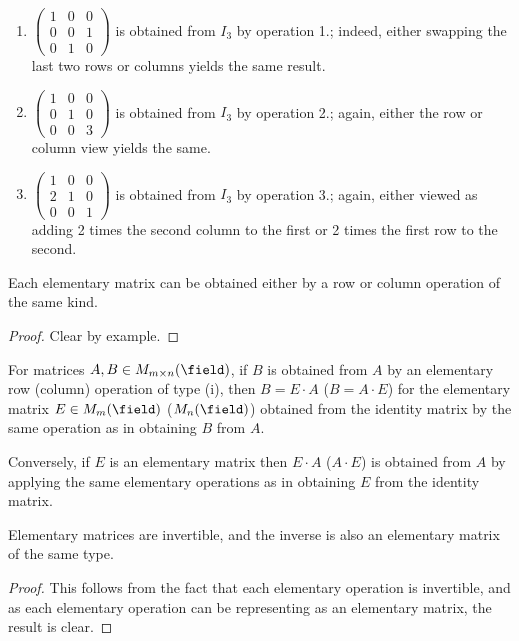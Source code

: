\begin{example}
    \begin{enumerate}
        \item $\begin{pmatrix}
            1 & 0 & 0\\
            0 & 0 & 1\\
            0 & 1 & 0
        \end{pmatrix}$ is obtained from $I_3$ by operation 1.; indeed, either swapping the last two rows or columns yields the same result.
        \item $\begin{pmatrix}
            1 & 0 & 0\\
            0 & 1 & 0\\
            0 & 0 & 3
        \end{pmatrix}$ is obtained from $I_3$ by operation 2.; again, either the row or column view yields the same.
        \item $\begin{pmatrix}
            1 & 0 & 0\\
            2 & 1 & 0\\
            0 & 0 & 1
        \end{pmatrix}$ is obtained from $I_3$ by operation 3.; again, either viewed as adding 2 times the second column to the first or 2 times the first row to the second.
    \end{enumerate}
\end{example}

\begin{theorem}
    Each elementary matrix can be obtained either by a row or column operation of the same kind.
\end{theorem}
\begin{proof}
    Clear by example.
\end{proof}

\begin{theorem}
For matrices $A, B \in M_{m \times n}(\field)$, if $B$ is obtained from $A$ by an elementary row (column) operation of type (i), then $B = E \cdot A$ ($B = A \cdot E$) for the elementary matrix $E \in M_{m}(\field)$ ($M_n(\field)$) obtained from the identity matrix by the same operation as in obtaining $B$ from $A$.

Conversely, if $E$ is an elementary matrix then $E \cdot A$ ($A \cdot E$) is obtained from $A$ by applying the same elementary operations as in obtaining $E$ from the identity matrix.
\end{theorem}


\begin{proposition}
    Elementary matrices are invertible, and the inverse is also an elementary matrix of the same type.
\end{proposition}
\begin{proof}
    This follows from the fact that each elementary operation is invertible, and as each elementary operation can be representing as an elementary matrix, the result is clear.
\end{proof}
